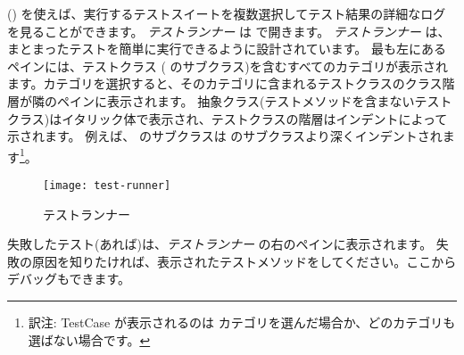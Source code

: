 \documentclass[a4paper,10pt,twoside]{book}
\begin{document}
\sunit {} () を使えば、実行するテストスイートを複数選択してテスト結果の詳細なログを見ることができます。
\emph{テストランナー} は  で開きます。
\emph{テストランナー} は、まとまったテストを簡単に実行できるように設計されています。
最も左にあるペインには、テストクラス (\ie {} のサブクラス)を含むすべてのカテゴリが表示されます。カテゴリを選択すると、そのカテゴリに含まれるテストクラスのクラス階層が隣のペインに表示されます。
抽象クラス(テストメソッドを含まないテストクラス)はイタリック体で表示され、テストクラスの階層はインデントによって示されます。
例えば、 のサブクラスは  のサブクラスより深くインデントされます\footnote{訳注: TestCase が表示されるのは  カテゴリを選んだ場合か、どのカテゴリも選ばない場合です。}。

\begin{figure}[tbh]
  \begin{center}
	\texttt{[image: test-runner]}
	\caption{\pharo \sunit テストランナー}
  \end{center}
\end{figure}





失敗したテスト(あれば)は、\emph{テストランナー} の右のペインに表示されます。
失敗の原因を知りたければ、表示されたテストメソッドを{\click}してください。ここからデバッグもできます。
\end{document}
